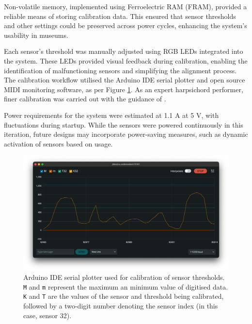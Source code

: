 Non-volatile memory, implemented using Ferroelectric RAM (FRAM), provided a reliable means of storing calibration data. This ensured that sensor thresholds and other settings could be preserved across power cycles, enhancing the system's usability in museums.


Each sensor's threshold was manually adjusted using RGB LEDs integrated into the system. These LEDs provided visual feedback during calibration, enabling the identification of malfunctioning sensors and simplifying the alignment process. The calibration workflow utilised the Arduino IDE serial plotter and open source MIDI monitoring software, as per Figure \ref{fig:serial_monitor}. As an expert harpsichord performer, finer calibration was carried out with the guidance of .


Power requirements for the system were estimated at 1.1 A at 5 V, with fluctuations during startup. While the sensors were powered continuously in this iteration, future designs may incorporate power-saving measures, such as dynamic activation of sensors based on usage.


\begin{figure}
    \centering
    \includegraphics[width=\linewidth]{src/images/serial_monitor.png}
    \caption{Arduino IDE serial plotter used for calibration of sensor thresholds. \texttt{M} and \texttt{m} represent the maximum an minimum value of digitised data. \texttt{K} and \texttt{T} are the values of the sensor and threshold being calibrated, followed by a two-digit number denoting the sensor index (in this case, sensor 32).}
    \label{fig:serial_monitor}
\end{figure}


